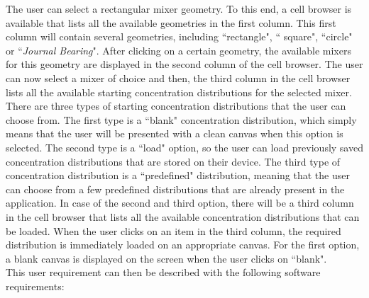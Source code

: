 The user can select a rectangular mixer geometry. To this end, a cell browser is available that lists all the available geometries in the first column. This first column will contain several geometries, including ``rectangle", `` square", ``circle" or ``\emph{Journal Bearing}". After clicking on a certain geometry, the available mixers for this geometry are displayed in the second column of the cell browser. The user can now select a mixer of choice and then, the third column in the cell browser lists all the available starting concentration distributions for the selected mixer. There are three types of starting concentration distributions that the user can choose from. The first type is a ``blank" concentration distribution, which simply means that the user will be presented with a clean canvas when this option is selected. The second type is a ``load" option, so the user can load previously saved concentration distributions that are stored on their device. The third type of concentration distribution is a ``predefined" distribution, meaning that the user can choose from a few predefined distributions that are already present in the application. In case of the second and third option, there will be a third column in the cell browser that lists all the available concentration distributions that can be loaded. When the user clicks on an item in the third column, the required distribution is immediately loaded on an appropriate canvas. For the first option, a blank canvas is displayed on the screen when the user clicks on ``blank". \\
This user requirement can then be described with the following software requirements:




